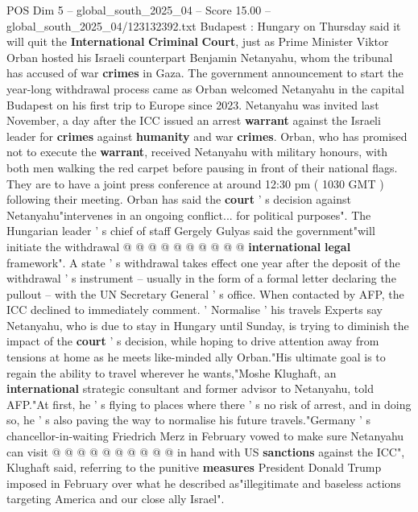 \begin{textsample}{POS Dim 5 – global\_south\_2025\_04 – Score 15.00 – global\_south\_2025\_04/123132392.txt}  \label{ex:f5_pos_090}
Budapest : Hungary on Thursday said it will quit the \textbf{International} \textbf{Criminal} \textbf{Court}, just as Prime Minister Viktor Orban hosted his Israeli counterpart Benjamin Netanyahu, whom the tribunal has accused of war \textbf{crimes} in Gaza.
The government announcement to start the year-long withdrawal process came as Orban welcomed Netanyahu in the capital Budapest on his first trip to Europe since 2023.
Netanyahu was invited last November, a day after the ICC issued an arrest \textbf{warrant} against the Israeli leader for \textbf{crimes} against \textbf{humanity} and war \textbf{crimes}.
Orban, who has promised not to execute the \textbf{warrant}, received Netanyahu with military honours, with both men walking the red carpet before pausing in front of their national flags.
They are to have a joint press conference at around 12:30 pm ( 1030 GMT ) following their meeting.
Orban has said the \textbf{court} ' s decision against Netanyahu"intervenes in an ongoing conflict... for political purposes".
The Hungarian leader ' s chief of staff Gergely Gulyas said the government"will initiate the withdrawal @ @ @ @ @ @ @ @ @ @ \textbf{international} \textbf{legal} framework".
A state ' s withdrawal takes effect one year after the deposit of the withdrawal ' s instrument -- usually in the form of a formal letter declaring the pullout -- with the UN Secretary General ' s office.
When contacted by AFP, the ICC declined to immediately comment. ' Normalise ' his travels Experts say Netanyahu, who is due to stay in Hungary until Sunday, is trying to diminish the impact of the \textbf{court} ' s decision, while hoping to drive attention away from tensions at home as he meets like-minded ally Orban."His ultimate goal is to regain the ability to travel wherever he wants,"Moshe Klughaft, an \textbf{international} strategic consultant and former advisor to Netanyahu, told AFP."At first, he ' s flying to places where there ' s no risk of arrest, and in doing so, he ' s also paving the way to normalise his future travels."Germany ' s chancellor-in-waiting Friedrich Merz in February vowed to make sure Netanyahu can visit @ @ @ @ @ @ @ @ @ @ in hand with US \textbf{sanctions} against the ICC", Klughaft said, referring to the punitive \textbf{measures} President Donald Trump imposed in February over what he described as"illegitimate and baseless actions targeting America and our close ally Israel".

\end{textsample}
